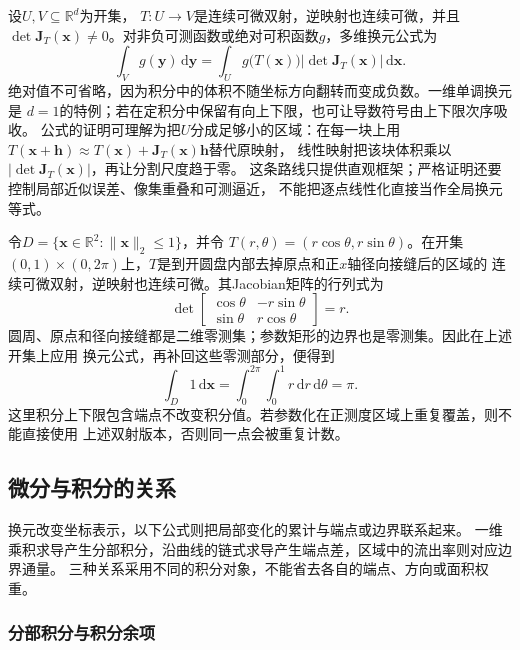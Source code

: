 设$U,V\subseteq\mathbb{R}^d$为开集， $T:U\to V$是连续可微双射，逆映射也连续可微，并且 $\det\bm{J}_T(\bm{x})\neq0$。对非负可测函数或绝对可积函数$g$，多维换元公式为
\begin{equation}
  \int_V g(\bm{y})\,\mathrm{d}\bm{y}
  =
  \int_U
  g\bigl(T(\bm{x})\bigr)
  \left|\det\bm{J}_T(\bm{x})\right|
  \,\mathrm{d}\bm{x}.
\label{eq:analysis-multivariate-change-variables}
\end{equation}
绝对值不可省略，因为积分中的体积不随坐标方向翻转而变成负数。一维单调换元是 $d=1$的特例；若在定积分中保留有向上下限，也可让导数符号由上下限次序吸收。
公式的证明可理解为把$U$分成足够小的区域：在每一块上用
$T(\bm{x}+\bm{h})\approx T(\bm{x})+\bm{J}_T(\bm{x})\bm{h}$替代原映射，
线性映射把该块体积乘以$|\det\bm{J}_T(\bm{x})|$，再让分割尺度趋于零。
这条路线只提供直观框架；严格证明还要控制局部近似误差、像集重叠和可测逼近，
不能把逐点线性化直接当作全局换元等式。
\begin{example}[极坐标中的面积权重]
\label{ex:analysis-polar-coordinate-jacobian}
令$D=\{\bm{x}\in\mathbb{R}^2:\lVert\bm{x}\rVert_2\leq1\}$，并令
$T(r,\theta)=(r\cos\theta,r\sin\theta)$。在开集
$(0,1)\times(0,2\pi)$上，$T$是到开圆盘内部去掉原点和正$x$轴径向接缝后的区域的
连续可微双射，逆映射也连续可微。其Jacobian矩阵的行列式为
\[   \det
\begin{bmatrix}     \cos\theta & -r\sin\theta\\     \sin\theta & r\cos\theta
\end{bmatrix}   =r. \]
圆周、原点和径向接缝都是二维零测集；参数矩形的边界也是零测集。因此在上述开集上应用
换元公式，再补回这些零测部分，便得到
\[   \int_D1\,\mathrm{d}\bm{x}   =   \int_0^{2\pi}\int_0^1r\,\mathrm{d}r\,\mathrm{d}\theta   =\pi. \]
这里积分上下限包含端点不改变积分值。若参数化在正测度区域上重复覆盖，则不能直接使用
上述双射版本，否则同一点会被重复计数。
\end{example}
\subsection{微分与积分的关系}

换元改变坐标表示，以下公式则把局部变化的累计与端点或边界联系起来。
一维乘积求导产生分部积分，沿曲线的链式求导产生端点差，区域中的流出率则对应边界通量。
三种关系采用不同的积分对象，不能省去各自的端点、方向或面积权重。

\subsubsection{分部积分与积分余项}
\label{sec:analysis-integration-remainders}


